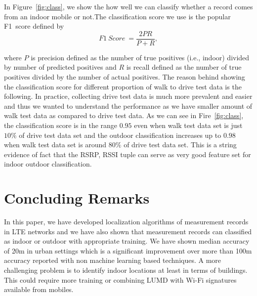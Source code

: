 \documentclass[conference, 10pt]{IEEEtran}
\begin{document}
In Figure~\ref{fig:class}, we show the how well we can classify whether a record
comes from an indoor mobile or not.The classification score we use is the popular
F1~score\cite{eval_fscore} defined by
$$F1\ Score\ =
\frac{2PR}{P+R},$$

where $P$ is precision defined as the number of true positives (i.e., indoor)
divided by number of predicted positives and $R$ is recall defined as the number of
true positives divided by the number of actual positives. The reason behind showing
the classification score for different proportion of walk to drive test data is the
following. In practice, collecting drive test data is much more prevalent and easier
and thus we wanted to understand the performance as we have smaller amount of walk
test data as compared to drive test data. As we can see in Fire~\ref{fig:class},  the
classification score is in the range $0.95$ even when walk test data set is just
$10\%$ of drive test data set and the outdoor classification increases up to $0.98$
when walk test data set is around $80\%$ of drive test data set. This is a string
evidence of fact that the RSRP, RSSI tuple can serve as very good feature set for
indoor outdoor classification. 






\section{Concluding Remarks}
\label{sec:concl}

In this paper, we have developed localization algorithms of measurement records in
LTE networks and we have also shown that measurement records can classified as indoor
or outdoor with appropriate training. We have shown median accuracy of 20m in urban
settings which is a significant improvement over more than 100m accuracy reported
with non machine learning based techniques. A more challenging problem is to identify
indoor locations at least in terms of buildings. This could require more training or
combining LUMD with Wi-Fi signatures available from mobiles.




%
%    

{%


}
\end{document}

